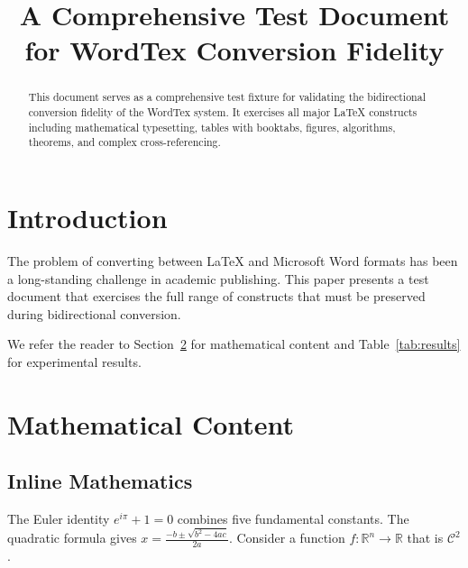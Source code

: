 \documentclass[conference]{IEEEtran}
\begin{document}
\title{A Comprehensive Test Document for WordTex Conversion Fidelity}

\author{
    \and
}

\maketitle

\begin{abstract}
This document serves as a comprehensive test fixture for validating the
bidirectional conversion fidelity of the WordTex system. It exercises all
major LaTeX constructs including mathematical typesetting, tables with
booktabs, figures, algorithms, theorems, and complex cross-referencing.
\end{abstract}

\section{Introduction}
\label{sec:intro}

The problem of converting between \LaTeX{} and Microsoft Word formats
has been a long-standing challenge in academic publishing. This paper
presents a test document that exercises the full range of constructs
that must be preserved during bidirectional conversion.

We refer the reader to Section~\ref{sec:math} for mathematical content
and Table~\ref{tab:results} for experimental results.

\section{Mathematical Content}
\label{sec:math}

\subsection{Inline Mathematics}

The Euler identity $e^{i\pi} + 1 = 0$ combines five fundamental constants.
The quadratic formula gives $x = \frac{-b \pm \sqrt{b^2 - 4ac}}{2a}$.
Consider a function $f: \mathbb{R}^n \to \mathbb{R}$ that is $\mathcal{C}^2$.
\end{document}
